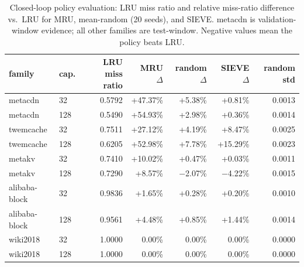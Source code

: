 \begin{table}[t]
  \centering
  \footnotesize
  \caption{Closed-loop policy evaluation: LRU miss ratio and relative miss-ratio difference vs.\ LRU for MRU, mean-random (20 seeds), and SIEVE. metacdn is validation-window evidence; all other families are test-window. Negative values mean the policy beats LRU.}
  \label{tab:tier1-closed-loop}
  \begin{tabularx}{\columnwidth}{@{}llrrrrr@{}}
    \toprule
    family & cap. & LRU miss ratio & MRU $\Delta$ & random $\Delta$ & SIEVE $\Delta$ & random std \\
    \midrule
    metacdn      & 32  & 0.5792 & +47.37\% & +5.38\% & +0.81\%  & 0.0013 \\
    metacdn      & 128 & 0.5490 & +54.93\% & +2.98\% & +0.36\%  & 0.0014 \\
    twemcache    & 32  & 0.7511 & +27.12\% & +4.19\% & +8.47\%  & 0.0025 \\
    twemcache    & 128 & 0.6205 & +52.98\% & +7.78\% & +15.29\% & 0.0023 \\
    metakv       & 32  & 0.7410 & +10.02\% & +0.47\% & +0.03\%  & 0.0011 \\
    metakv       & 128 & 0.7290 & +8.57\%  & $-$2.07\% & $-$4.22\% & 0.0015 \\
    alibaba-block & 32  & 0.9836 & +1.65\%  & +0.28\% & +0.20\%  & 0.0010 \\
    alibaba-block & 128 & 0.9561 & +4.48\%  & +0.85\% & +1.44\%  & 0.0014 \\
    wiki2018     & 32  & 1.0000 & 0.00\%   & 0.00\%  & 0.00\%   & 0.0000 \\
    wiki2018     & 128 & 1.0000 & 0.00\%   & 0.00\%  & 0.00\%   & 0.0000 \\
    \bottomrule
  \end{tabularx}
\end{table}

